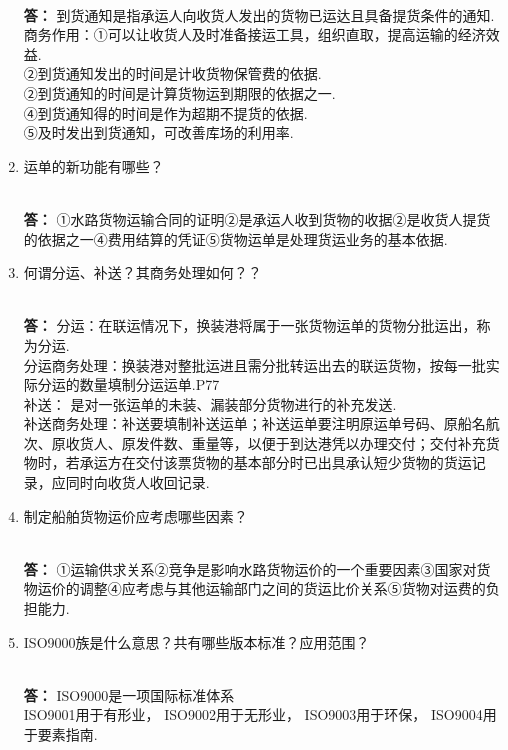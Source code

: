 \documentclass[UTF8]{ctexart}
\begin{document}
\begin{enumerate}[1]
\\ \textbf{答：} 到货通知是指承运人向收货人发出的货物已运达且具备提货条件的通知.
\\ 商务作用：①可以让收货人及时准备接运工具，组织直取，提高运输的经济效益.
\\ ②到货通知发出的时间是计收货物保管费的依据.
\\ ②到货通知的时间是计算货物运到期限的依据之一.
\\ ④到货通知得的时间是作为超期不提货的依据.
\\ ⑤及时发出到货通知，可改善库场的利用率.
\item \begin{CJK}{UTF8}{you} 运单的新功能有哪些？\end{CJK}
\\ \textbf{答：}  ①水路货物运输合同的证明②是承运人收到货物的收据②是收货人提货的依据之一④费用结算的凭证⑤货物运单是处理货运业务的基本依据.
\item \begin{CJK}{UTF8}{you} 何谓分运、补送？其商务处理如何？？\end{CJK}
\\ \textbf{答：}  分运：在联运情况下，换装港将属于一张货物运单的货物分批运出，称为分运.
\\ 分运商务处理：换装港对整批运进且需分批转运出去的联运货物，按每一批实际分运的数量填制分运运单.P77
\\ 补送： 是对一张运单的未装、漏装部分货物进行的补充发送.
\\ 补送商务处理：补送要填制补送运单；补送运单要注明原运单号码、原船名航次、原收货人、原发件数、重量等，以便于到达港凭以办理交付；交付补充货物时，若承运方在交付该票货物的基本部分时已出具承认短少货物的货运记录，应同时向收货人收回记录.
\item \begin{CJK}{UTF8}{you} 制定船舶货物运价应考虑哪些因素？\end{CJK}
\\ \textbf{答：}  ①运输供求关系②竞争是影响水路货物运价的一个重要因素③国家对货物运价的调整④应考虑与其他运输部门之间的货运比价关系⑤货物对运费的负担能力.
\item \begin{CJK}{UTF8}{you} ISO9000族是什么意思？共有哪些版本标准？应用范围？\end{CJK}
\\ \textbf{答：} ISO9000是一项国际标准体系
\\  ISO9001用于有形业， ISO9002用于无形业， ISO9003用于环保， ISO9004用于要素指南.
\\
\end{enumerate}
\end{document}
